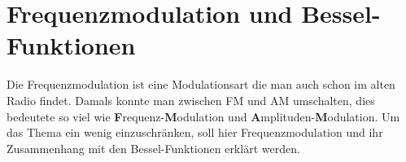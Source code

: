 %
%
% 

\chapter{Frequenzmodulation und Bessel-Funktionen\label{chapter:fm}}
\begin{refsection}


\noindent
Die Frequenzmodulation ist eine Modulationsart die man auch schon im alten
Radio findet. 
Damals konnte man zwischen FM und AM umschalten, 
dies bedeutete so viel wie
\textbf{F}requenz-\textbf{M}odulation und
\textbf{A}mplituden-\textbf{M}odulation.
Um das Thema ein wenig einzuschränken, soll hier Frequenzmodulation und
ihr Zusammenhang mit den Bessel-Funktionen erklärt werden.







\printbibliography[heading=subbibliography]
\end{refsection}


